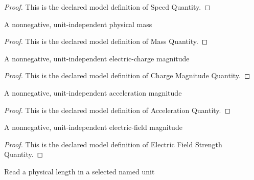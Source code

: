 \begin{proof}
  This is the declared model definition of Speed Quantity.
\end{proof}
\begin{definition}
  \label{def:physics:phyx-mini-0836:phyxminiproblems-problemphyxmini0836-massquantity}
  A nonnegative, unit-independent physical mass
\end{definition}
\begin{proof}
  This is the declared model definition of Mass Quantity.
\end{proof}
\begin{definition}
  \label{def:physics:phyx-mini-0836:phyxminiproblems-problemphyxmini0836-chargemagnitudequantity}
  A nonnegative, unit-independent electric-charge magnitude
\end{definition}
\begin{proof}
  This is the declared model definition of Charge Magnitude Quantity.
\end{proof}
\begin{definition}
  \label{def:physics:phyx-mini-0836:phyxminiproblems-problemphyxmini0836-accelerationquantity}
  A nonnegative, unit-independent acceleration magnitude
\end{definition}
\begin{proof}
  This is the declared model definition of Acceleration Quantity.
\end{proof}
\begin{definition}
  \label{def:physics:phyx-mini-0836:phyxminiproblems-problemphyxmini0836-electricfieldstrengthquantity}
  A nonnegative, unit-independent electric-field magnitude
\end{definition}
\begin{proof}
  This is the declared model definition of Electric Field Strength Quantity.
\end{proof}
\begin{definition}
  \label{def:physics:phyx-mini-0836:phyxminiproblems-problemphyxmini0836-lengthreadout}
  Read a physical length in a selected named unit
\end{definition}

